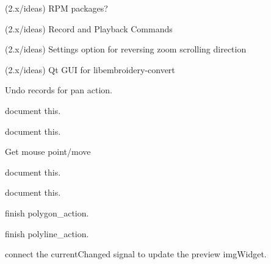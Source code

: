 \begin{DoxyRefList}
\label{todo__todo000319}%
%
(2.\+x/ideas) RPM packages?

\label{todo__todo000321}%
%
(2.\+x/ideas) Record and Playback Commands

\label{todo__todo000322}%
%
(2.\+x/ideas) Settings option for reversing zoom scrolling direction

\label{todo__todo000323}%
%
(2.\+x/ideas) Qt GUI for libembroidery-\/convert 
\item[Member \mbox{\hyperlink{imgui__main_8c_a61c74a220500dc98b0a69f9caa1b606a}{pan\+\_\+action}} (const char $\ast$mode)]\label{todo__todo000113}%
%
Undo records for pan action.  
\item[Member \mbox{\hyperlink{imgui__main_8c_ae0800b18cad9b17d3b26da24544f1d8f}{paste}} (void)]\label{todo__todo000056}%
%
document this.  
\item[Member \mbox{\hyperlink{imgui__main_8c_a59c3cf8b0862a693755b117365055eaa}{paste\+\_\+action}} (void)]\label{todo__todo000114}%
%
document this.  
\item[Member \mbox{\hyperlink{imgui__main_8c_a06a4dd5f19b0327917ec50daf98b8c57}{paste\+\_\+selected}} (void)]\label{todo__todo000158}%
%
Get mouse point/move  
\item[Member \mbox{\hyperlink{imgui__main_8c_a05199e8a973414ddc53073d4fcf16b01}{pattern\+\_\+view}} (void)]\label{todo__todo000081}%
%
document this.  
\item[Member \mbox{\hyperlink{imgui__main_8c_ad37c25f1f6b31615c1cc03377ff88676}{pick\+Add\+Mode\+Toggled}} (void)]\label{todo__todo000171}%
%
document this.  
\item[Member \mbox{\hyperlink{imgui__main_8c_af4def00971243cdeea8f9705a6e64b30}{polygon\+\_\+action}} (void)]\label{todo__todo000151}%
%
finish polygon\+\_\+action.  
\item[Member \mbox{\hyperlink{imgui__main_8c_a8aff00f850489a80974f29458d113d46}{polyline\+\_\+action}} (Emb\+Vector start, Emb\+Path $\ast$p, int rubber\+Mode)]\label{todo__todo000152}%
%
finish polyline\+\_\+action.  
\item[Member \mbox{\hyperlink{imgui__main_8c_a0874fa8b4d857b5527c706a3fce40e0f}{preview\+\_\+dialog}} (void)]\label{todo__todo000024}%
%
connect the current\+Changed signal to update the preview img\+Widget. 


\end{DoxyRefList}
